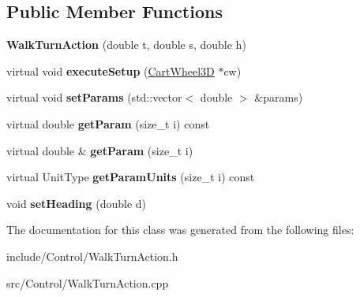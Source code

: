 \subsection*{Public Member Functions}
\begin{DoxyCompactItemize}
\item 
\hypertarget{classCartWheel_1_1WalkTurnAction_a749963c1fc79992de1b5073f8e42b844}{
{\bfseries WalkTurnAction} (double t, double s, double h)}
\label{classCartWheel_1_1WalkTurnAction_a749963c1fc79992de1b5073f8e42b844}

\item 
\hypertarget{classCartWheel_1_1WalkTurnAction_a727cbc510c86e8e16762b9d1312d6d37}{
virtual void {\bfseries executeSetup} (\hyperlink{classCartWheel_1_1CartWheel3D}{CartWheel3D} $\ast$cw)}
\label{classCartWheel_1_1WalkTurnAction_a727cbc510c86e8e16762b9d1312d6d37}

\item 
\hypertarget{classCartWheel_1_1WalkTurnAction_a9d8c1c3ea98f3db0328b9ce0d7839ddb}{
virtual void {\bfseries setParams} (std::vector$<$ double $>$ \&params)}
\label{classCartWheel_1_1WalkTurnAction_a9d8c1c3ea98f3db0328b9ce0d7839ddb}

\item 
\hypertarget{classCartWheel_1_1WalkTurnAction_a2d1128ecf5a838579cf19025dc693322}{
virtual double {\bfseries getParam} (size\_\-t i) const }
\label{classCartWheel_1_1WalkTurnAction_a2d1128ecf5a838579cf19025dc693322}

\item 
\hypertarget{classCartWheel_1_1WalkTurnAction_ad3a9bfcacc2f74672379491419e10654}{
virtual double \& {\bfseries getParam} (size\_\-t i)}
\label{classCartWheel_1_1WalkTurnAction_ad3a9bfcacc2f74672379491419e10654}

\item 
\hypertarget{classCartWheel_1_1WalkTurnAction_af3139bec6cb49f582b6b7662a9c39eb5}{
virtual UnitType {\bfseries getParamUnits} (size\_\-t i) const }
\label{classCartWheel_1_1WalkTurnAction_af3139bec6cb49f582b6b7662a9c39eb5}

\item 
\hypertarget{classCartWheel_1_1WalkTurnAction_a134f98eee9fa98e4365c9f6ce4a3cfa2}{
void {\bfseries setHeading} (double d)}
\label{classCartWheel_1_1WalkTurnAction_a134f98eee9fa98e4365c9f6ce4a3cfa2}

\end{DoxyCompactItemize}


The documentation for this class was generated from the following files:\begin{DoxyCompactItemize}
\item 
include/Control/WalkTurnAction.h\item 
src/Control/WalkTurnAction.cpp\end{DoxyCompactItemize}
